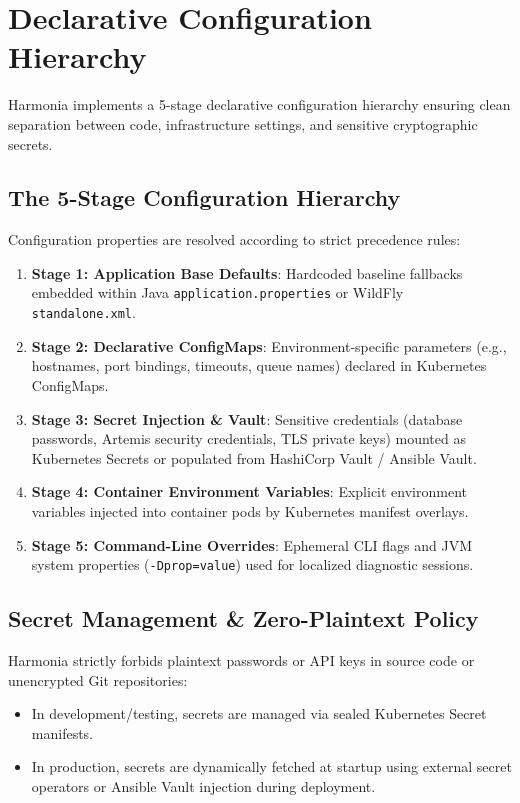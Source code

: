 
\chapter{Declarative Configuration Hierarchy}
\label{chap:configuration_hierarchy}

Harmonia implements a 5-stage declarative configuration hierarchy ensuring clean separation between code, infrastructure settings, and sensitive cryptographic secrets.

\section{The 5-Stage Configuration Hierarchy}

Configuration properties are resolved according to strict precedence rules:
\begin{enumerate}
    \item \textbf{Stage 1: Application Base Defaults}: Hardcoded baseline fallbacks embedded within Java \texttt{application.properties} or WildFly \texttt{standalone.xml}.
    \item \textbf{Stage 2: Declarative ConfigMaps}: Environment-specific parameters (e.g., hostnames, port bindings, timeouts, queue names) declared in Kubernetes ConfigMaps.
    \item \textbf{Stage 3: Secret Injection \& Vault}: Sensitive credentials (database passwords, Artemis security credentials, TLS private keys) mounted as Kubernetes Secrets or populated from HashiCorp Vault / Ansible Vault.
    \item \textbf{Stage 4: Container Environment Variables}: Explicit environment variables injected into container pods by Kubernetes manifest overlays.
    \item \textbf{Stage 5: Command-Line Overrides}: Ephemeral CLI flags and JVM system properties (\texttt{-Dprop=value}) used for localized diagnostic sessions.
\end{enumerate}

\section{Secret Management \& Zero-Plaintext Policy}

Harmonia strictly forbids plaintext passwords or API keys in source code or unencrypted Git repositories:
\begin{itemize}
    \item In development/testing, secrets are managed via sealed Kubernetes Secret manifests.
    \item In production, secrets are dynamically fetched at startup using external secret operators or Ansible Vault injection during deployment.
\end{itemize}

\newpage
